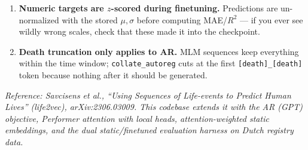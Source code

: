 \documentclass[11pt,a4paper]{article}
\newcommand{\code}[1]{\texttt{\small #1}}
\begin{document}
\begin{enumerate}[itemsep=2pt]
    sweep validation probabilities for the F1-optimal threshold and persist it
    in the model file (\code{best\_thr}); test-time labels use that stored
    threshold.
  \item \textbf{Numeric targets are $z$-scored during finetuning.} Predictions
    are un-normalized with the stored $\mu,\sigma$ before computing MAE/$R^2$
    --- if you ever see wildly wrong scales, check that these made it into the
    checkpoint.
  \item \textbf{Death truncation only applies to AR.} MLM sequences keep
    everything within the time window; \code{collate\_autoreg} cuts at the first
    \code{[death]\_[death]} token because nothing after it should be generated.
\end{enumerate}

\vspace{4mm}
\noindent\emph{Reference: Savcisens et al., ``Using Sequences of Life-events to
Predict Human Lives'' (life2vec), arXiv:2306.03009. This codebase extends it
with the AR (GPT) objective, Performer attention with local heads,
attention-weighted static embeddings, and the dual static/finetuned evaluation
harness on Dutch registry data.}
\end{document}

